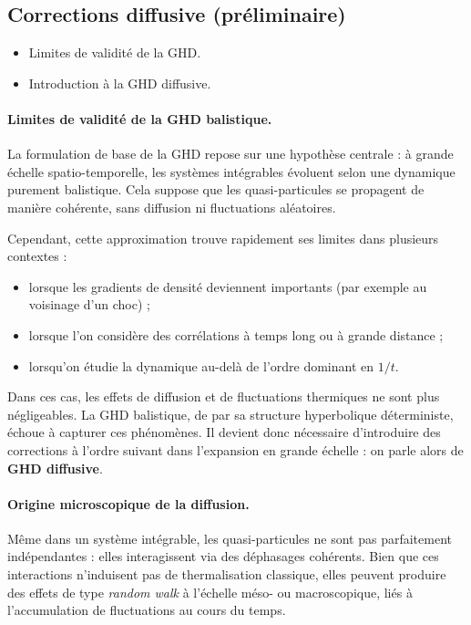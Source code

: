 \subsection{Corrections diffusive (préliminaire)}
{\color{blue}
\begin{itemize}
    \item Limites de validité de la GHD.
    \item Introduction à la GHD diffusive.
\end{itemize}
}

\paragraph{Limites de validité de la GHD balistique.}
La formulation de base de la GHD repose sur une hypothèse centrale : à grande échelle spatio-temporelle, les systèmes intégrables évoluent selon une dynamique purement balistique. Cela suppose que les quasi-particules se propagent de manière cohérente, sans diffusion ni fluctuations aléatoires.

Cependant, cette approximation trouve rapidement ses limites dans plusieurs contextes :
\begin{itemize}
    \item lorsque les gradients de densité deviennent importants (par exemple au voisinage d’un choc) ;
    \item lorsque l'on considère des corrélations à temps long ou à grande distance ;
    \item lorsqu’on étudie la dynamique au-delà de l’ordre dominant en $1/t$.
\end{itemize}

Dans ces cas, les effets de diffusion et de fluctuations thermiques ne sont plus négligeables. La GHD balistique, de par sa structure hyperbolique déterministe, échoue à capturer ces phénomènes. Il devient donc nécessaire d’introduire des corrections à l’ordre suivant dans l’expansion en grande échelle : on parle alors de \textbf{GHD diffusive}.

\paragraph{Origine microscopique de la diffusion.}
Même dans un système intégrable, les quasi-particules ne sont pas parfaitement indépendantes : elles interagissent via des déphasages cohérents. Bien que ces interactions n’induisent pas de thermalisation classique, elles peuvent produire des effets de type \emph{random walk} à l’échelle méso- ou macroscopique, liés à l’accumulation de fluctuations au cours du temps.

